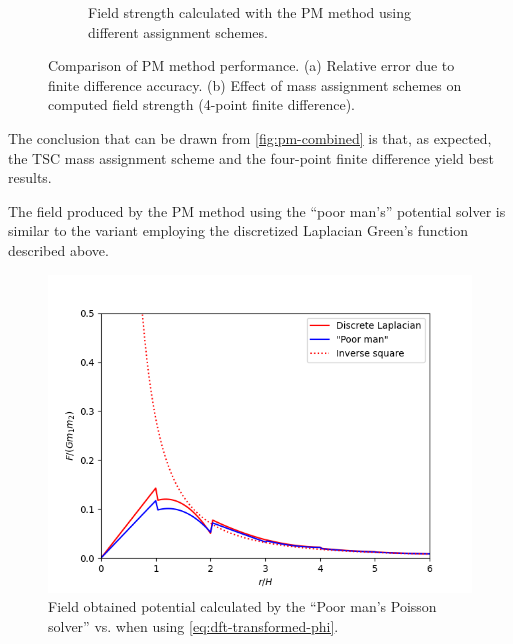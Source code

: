 \begin{figure}[htp]
\begin{subfigure}[t]{0.48\textwidth}
        \caption{Field strength calculated with the PM method using different assignment schemes.}
        \label{fig:pm-mass-assignment-field-strength}
    \end{subfigure}
    \caption{Comparison of PM method performance. (a) Relative error due to finite difference accuracy. (b) Effect of mass assignment schemes on computed field strength (4-point finite difference).}
    \label{fig:pm-combined}
\end{figure}
The conclusion that can be drawn from \autoref{fig:pm-combined} is that, as expected, the TSC mass assignment scheme and the four-point finite difference yield best results.

The field produced by the PM method using the ``poor man's'' potential solver is similar to the variant employing the discretized Laplacian Green's function described above.
\begin{figure}[htp]
    \centering
    \includegraphics[scale=0.55]{chapters/pm-method/img/poor-man-vs-laplacian.png}
    \caption{Field obtained potential calculated by the ``Poor man's Poisson solver'' vs. when using \autoref{eq:dft-transformed-phi}.}
    \label{fig:pm-poor-man-vs-laplacian}
\end{figure}

